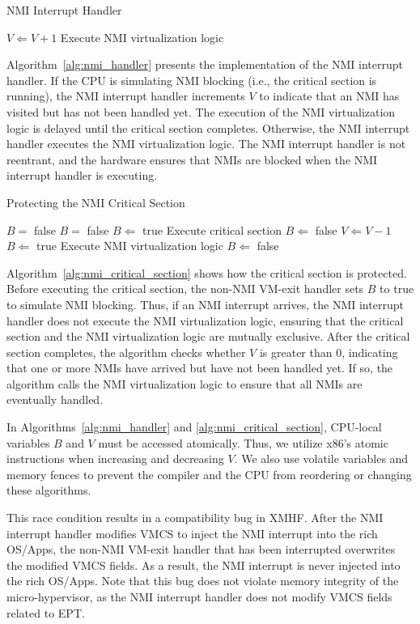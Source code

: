 \begin{algorithm}
\caption{NMI Interrupt Handler}
\label{alg:nmi_handler}
\begin{algorithmic}
		\STATE $V \Leftarrow V + 1$
	\ELSE[$B =$ false]
		\STATE Execute NMI virtualization logic
	\ENDIF
\end{algorithmic}
\end{algorithm}

Algorithm~\ref{alg:nmi_handler} presents the implementation of the NMI interrupt handler. If the CPU is simulating NMI blocking (i.e., the critical section is running), the NMI interrupt handler increments $V$ to indicate that an NMI has visited but has not been handled yet. The execution of the NMI virtualization logic is delayed until the critical section completes. Otherwise, the NMI interrupt handler executes the NMI virtualization logic. The NMI interrupt handler is not reentrant, and the hardware ensures that NMIs are blocked when the NMI interrupt handler is executing.

\begin{algorithm}
\caption{Protecting the NMI Critical Section}
\label{alg:nmi_critical_section}
\begin{algorithmic}
	\REQUIRE $B =$ false
	\ENSURE $B =$ false
	\STATE $B \Leftarrow$ true
	\STATE Execute critical section
	\STATE $B \Leftarrow$ false
		\STATE $V \Leftarrow V - 1$
		\STATE $B \Leftarrow$ true
		\STATE Execute NMI virtualization logic
		\STATE $B \Leftarrow$ false
	\ENDWHILE
\end{algorithmic}
\end{algorithm}

Algorithm~\ref{alg:nmi_critical_section} shows how the critical section is protected. Before executing the critical section, the non-NMI VM-exit handler sets $B$ to true to simulate NMI blocking. Thus, if an NMI interrupt arrives, the NMI interrupt handler does not execute the NMI virtualization logic, ensuring that the critical section and the NMI virtualization logic are mutually exclusive. After the critical section completes, the algorithm checks whether $V$ is greater than $0$, indicating that one or more NMIs have arrived but have not been handled yet. If so, the algorithm calls the NMI virtualization logic to ensure that all NMIs are eventually handled.

In Algorithms~\ref{alg:nmi_handler} and \ref{alg:nmi_critical_section}, CPU-local variables $B$ and $V$ must be accessed atomically. Thus, we utilize x86's atomic instructions when increasing and decreasing $V$. We also use volatile variables and memory fences to prevent the compiler and the CPU from reordering or changing these algorithms.

This race condition results in a compatibility bug in XMHF. After the NMI interrupt handler modifies VMCS to inject the NMI interrupt into the rich OS/Apps, the non-NMI VM-exit handler that has been interrupted overwrites the modified VMCS fields. As a result, the NMI interrupt is never injected into the rich OS/Apps. Note that this bug does not violate memory integrity of the micro-hypervisor, as the NMI interrupt handler does not modify VMCS fields related to EPT.

